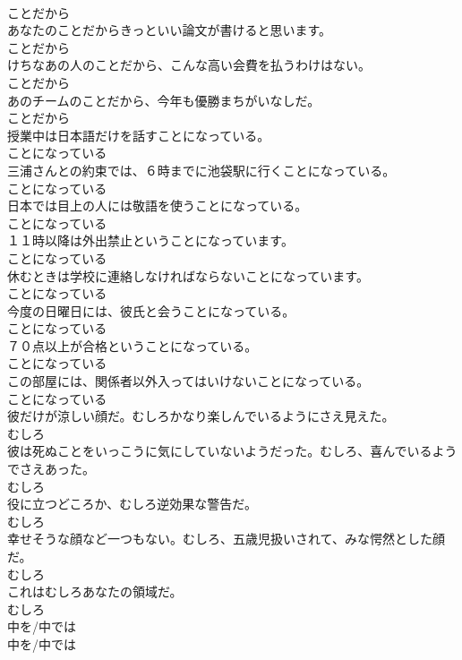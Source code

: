 \documentclass[8pt]{extreport}
\begin{document}
\begin{CJK}{UTF8}{min}
\\	ことだから
\\	あなたのことだからきっといい論文が書けると思います。	
\\	ことだから
\\	けちなあの人のことだから、こんな高い会費を払うわけはない。	
\\	ことだから
\\	あのチームのことだから、今年も優勝まちがいなしだ。	
\\	ことだから
\\	授業中は日本語だけを話すことになっている。	
\\	ことになっている
\\	三浦さんとの約束では、６時までに池袋駅に行くことになっている。	
\\	ことになっている
\\	日本では目上の人には敬語を使うことになっている。	
\\	ことになっている
\\	１１時以降は外出禁止ということになっています。	
\\	ことになっている
\\	休むときは学校に連絡しなければならないことになっています。	
\\	ことになっている
\\	今度の日曜日には、彼氏と会うことになっている。	
\\	ことになっている
\\	７０点以上が合格ということになっている。	
\\	ことになっている
\\	この部屋には、関係者以外入ってはいけないことになっている。	
\\	ことになっている
\\	彼だけが涼しい顔だ。むしろかなり楽しんでいるようにさえ見えた。	
\\	むしろ
\\	彼は死ぬことをいっこうに気にしていないようだった。むしろ、喜んでいるようでさえあった。	
\\	むしろ
\\	役に立つどころか、むしろ逆効果な警告だ。	
\\	むしろ
\\	幸せそうな顔など一つもない。むしろ、五歳児扱いされて、みな愕然とした顔だ。	
\\	むしろ
\\	これはむしろあなたの領域だ。	
\\	むしろ
\\	中を/中では	
\\	中を/中では	

\end{CJK}
\end{document}
